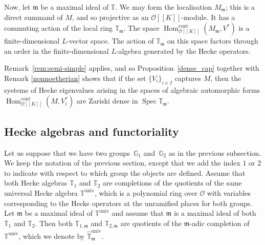 \documentclass[11pt]{article}
\let\mathcal\mathscr
\theoremstyle{definition}
\DeclareMathOperator{\Hom}{Hom}
\DeclareMathOperator{\Spec}{Spec}
\newcommand{\br}[1]{[\![#1]\!]}
\newcommand{\mm}{\mathfrak m}
\newcommand{\cO}{\mathcal{O}}
\newcommand{\cont}{\mathrm{cont}}
\newcommand{\univ}{\mathrm{univ}}
\begin{document}
Now, let $\mathfrak m$ be a maximal ideal of $\mathbb T$.
We may form the localisation $M_{\mathfrak m}$; this is a direct
summand of $M$, and so projective as an $\mathcal O\br{K}$-module.
It has a commuting action of the local ring $\mathbb T_{\mathfrak m}$.
The space $\Hom_{\mathcal O\br{K}}^{\cont}(M_{\mathfrak m},V^*)$
is a finite-dimensional $L$\nobreakdash-vector space.
The action of $\mathbb T_{\mathfrak m}$ on this space
factors through an order in the finite-dimensional $L$-algebra
generated by the Hecke operators.

Remark~\ref{rem:semi-simple} applies, and so Proposition~\ref{dense_cap} together with Remark \ref{nonnoetherian}
shows that if the set $\{V_i\}_{i \in I}$ captures $M$,
then the systems of Hecke eigenvalues arising
in the spaces of algebraic automorphic forms
$\Hom_{\mathcal O\br{K}}^{\cont}(M,V_i^*)$
are Zariski dense in $\Spec \mathbb T_{\mathfrak m}$.

\subsection{Hecke algebras and functoriality} Let us suppose that we have two groups~$\mathbb G_1$ and~$\mathbb G_2$ as in the previous
subsection. We keep the notation of the previous section,
except that we add the index $1$ or $2$ to indicate with respect to which group the objects are defined. Assume that both Hecke algebras $\mathbb T_1$ and $\mathbb T_2$ are completions of the quotients
of the same universal Hecke algebra $\mathbb T^{\univ}$, which is a polynomial ring over
$\cO$ with variables corresponding to the Hecke operators at the unramified places for both groups.
Let $\mm$ be a maximal ideal of $\mathbb T^{\univ}$ and assume that $\mm$ is a maximal ideal of both $\mathbb T_1$ and $\mathbb T_2$. Then both $\mathbb T_{1,\mm}$ and $\mathbb T_{2,\mm}$ are quotients of the $\mm$-adic completion of $\mathbb T^{\univ}$, which we denote by $\widehat{\mathbb T}^{\univ}_{\mm}$.
\end{document}
